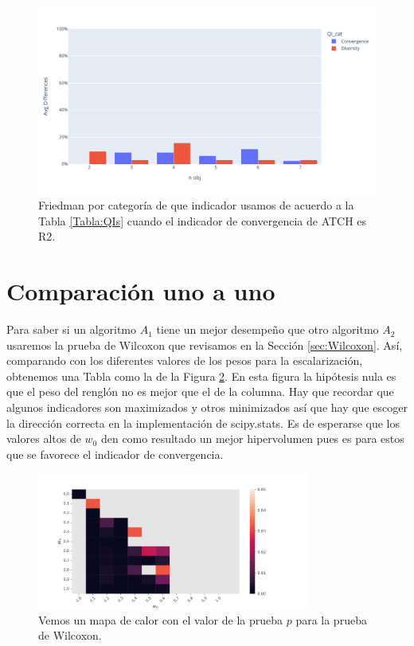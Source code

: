 \begin{figure}[H]
    \centering
    \includegraphics[width=\textwidth]{Figuras/Friedman_Diferencia_por_categoria_R2.pdf}
    \caption[Friedman por categoría para R2.]{Friedman por categoría de que indicador usamos de acuerdo a la Tabla \ref{Tabla:QIs} cuando el indicador de convergencia de ATCH es R2.}
    \label{fig:Friedman_Diferencia_por_categoria_R2}
\end{figure}


\section*{Comparación uno a uno}
Para saber si un algoritmo $A_1$ tiene un mejor desempeño que otro algoritmo $A_2$ usaremos la prueba de Wilcoxon que revisamos en la Sección \ref{sec:Wilcoxon}. Así, comparando con los diferentes valores de los pesos para la escalarización, obtenemos una Tabla como la de la Figura \ref{fig:heat}. En esta figura la hipótesis nula es que el peso del renglón no es mejor que el de la columna. Hay que recordar que algunos indicadores son maximizados y otros minimizados así que hay que escoger la dirección correcta en la implementación de scipy.stats. Es de esperarse que los valores altos de $w_0$ den como resultado un mejor hipervolumen pues es para estos que se favorece el indicador de convergencia.

\begin{figure} [H]
    \centering
    \includegraphics[width=0.8\textwidth]{Figuras/Heatmap_WFG4_obj3_hv_indconv_IGD+.pdf}
    \caption[Heatmap Wilcoxon]{Vemos un mapa de calor con el valor de la prueba $p$ para la prueba de Wilcoxon. }
    \label{fig:heat}
\end{figure}

